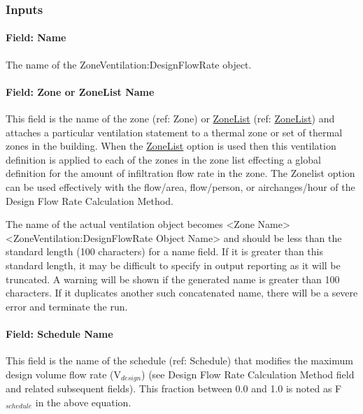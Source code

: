 \subsubsection{Inputs}\label{inputs-2016-06-17-0936}

\paragraph{Field: Name}\label{field-name-2016-06-16}

The name of the ZoneVentilation:DesignFlowRate object.

\paragraph{Field: Zone or ZoneList Name}\label{field-zone-or-zonelist-name-1}

This field is the name of the zone (ref: Zone) or \hyperref[zonelist]{ZoneList} (ref: \hyperref[zonelist]{ZoneList}) and attaches a particular ventilation statement to a thermal zone or set of thermal zones in the building. When the \hyperref[zonelist]{ZoneList} option is used then this ventilation definition is applied to each of the zones in the zone list effecting a global definition for the amount of infiltration flow rate in the zone. The Zonelist option can be used effectively with the flow/area, flow/person, or airchanges/hour of the Design Flow Rate Calculation Method.

The name of the actual ventilation object becomes \textless{}Zone Name\textgreater{} \textless{}ZoneVentilation:DesignFlowRate Object Name\textgreater{} and should be less than the standard length (100 characters) for a name field. If it is greater than this standard length, it may be difficult to specify in output reporting as it will be truncated. A warning will be shown if the generated name is greater than 100 characters. If it duplicates another such concatenated name, there will be a severe error and terminate the run.

\paragraph{Field: Schedule Name}\label{field-schedule-name-2016-06-16}

This field is the name of the schedule (ref: Schedule) that modifies the maximum design volume flow rate (V\(_{design}\)) (see Design Flow Rate Calculation Method field and related subsequent fields). This fraction between 0.0 and 1.0 is noted as F\(_{schedule}\) in the above equation.

